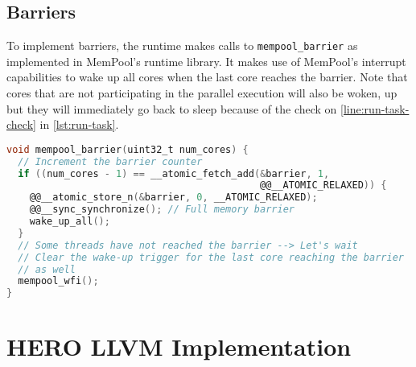 \subsection{Barriers}
\label{subsec:barriers}

To implement barriers, the runtime makes calls to \texttt{mempool\_barrier} as implemented in
MemPool's runtime library. It makes use of MemPool's interrupt capabilities to wake up all cores
when the last core reaches the barrier. Note that cores that are not participating in the parallel
execution will also be woken, up but they will immediately go back to sleep because of the check on
\cref{line:run-task-check} in \cref{lst:run-task}.

\begin{lstlisting}[language=C, caption={mempool\_barrier Implementation}, label={lst:mempool-barrier},
                   escapechar=@]
void mempool_barrier(uint32_t num_cores) {
  // Increment the barrier counter
  if ((num_cores - 1) == __atomic_fetch_add(&barrier, 1,
                                            @@__ATOMIC_RELAXED)) {
    @@__atomic_store_n(&barrier, 0, __ATOMIC_RELAXED);
    @@__sync_synchronize(); // Full memory barrier
    wake_up_all();
  }
  // Some threads have not reached the barrier --> Let's wait
  // Clear the wake-up trigger for the last core reaching the barrier
  // as well
  mempool_wfi();
}
\end{lstlisting}

\section{HERO LLVM Implementation}
\label{subsec:hero_llvm_implementation}
